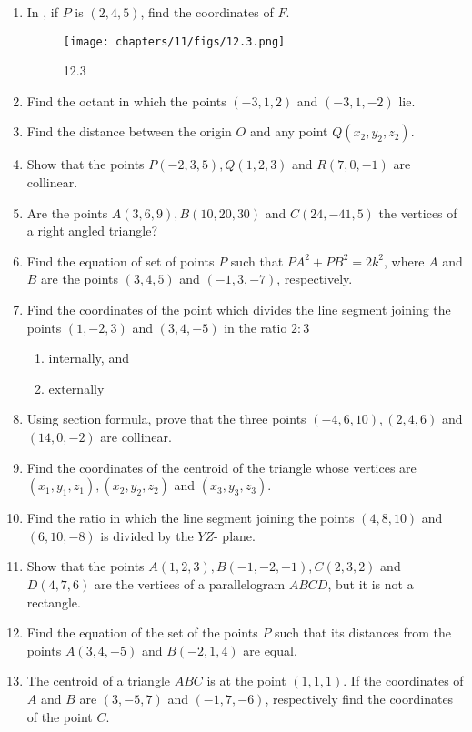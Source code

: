 \begin{enumerate}
\item In , if $P$ is $(2,4,5)$, find the coordinates of $F$.
\begin{figure}[h]
\centering
\texttt{[image: chapters/11/figs/12.3.png]}
\caption{12.3}
\label{fig:12.3}
\end{figure}
\item Find the octant in which the points $(-3,1,2)$ and $(-3,1,-2)$ lie.
\item Find the distance between the origin $O$ and any point $Q(x_2,y_2,z_2)$.
\item Show that the points $P(-2,3,5), Q(1,2,3)$ and $R(7,0,-1)$ are collinear. 
\item Are the points $A(3,6,9), B(10,20,30)$ and $C(24,-41,5)$ the vertices of a right angled triangle?
\item Find the equation of set of points $P$ such that $PA^2+PB^2=2k^2$, where $A$ and $B$ are the points $(3,4,5)$ and $(-1,3,-7)$, respectively.
\item Find the coordinates of the point which divides the line segment joining the points $(1,-2,3)$ and $(3,4,-5)$ in the ratio $2:3$
\begin{enumerate}[label=(\roman*)]
\item internally, and
\item externally
\end{enumerate}
\item Using section formula, prove that the three points $(-4,6,10), (2,4,6)$ and $(14,0,-2)$ are collinear.
\item Find the coordinates of the centroid of the triangle whose vertices are $(x_1,y_1,z_1), (x_2,y_2,z_2)$ and $(x_3,y_3,z_3)$.
\item Find the ratio in which the line segment joining the points $(4,8,10)$ and $(6,10,-8)$ is divided by the $YZ$- plane.
\item Show that the points $A(1,2,3), B(-1,-2,-1), C(2,3,2)$ and $D(4,7,6)$ are the vertices of a parallelogram $ABCD$, but it is not a rectangle.
\item Find the equation of the set of the points $P$ such that its distances from the points $A(3,4,-5)$ and $B(-2,1,4)$ are equal.
\item The centroid of a triangle $ABC$ is at the point $(1,1,1)$. If the coordinates of $A$ and $B$ are $(3,-5,7)$ and $(-1,7,-6)$, respectively find the coordinates of the point $C$.
\end{enumerate}

